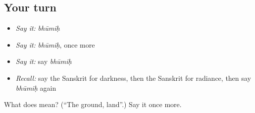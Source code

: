 \subsection*{Your turn}
\begin{itemize}
\raggedright
  \item \emph{Say it:} \emph{bhūmiḥ}
  \item \emph{Say it:} \emph{bhūmiḥ}, once more
  \item \emph{Say it:} say \emph{bhūmiḥ}
  \item \emph{Recall:} say the Sanskrit for darkness, then the Sanskrit for radiance, then say \emph{bhūmiḥ} again
\end{itemize}

\begin{tcolorbox}[breakable,colback=teal!4,colframe=teal!35!black,title={Before you move on}]
What does  mean? (\textquotedblleft{}The ground, land\textquotedblright{}.) Say it once more.
\end{tcolorbox}
